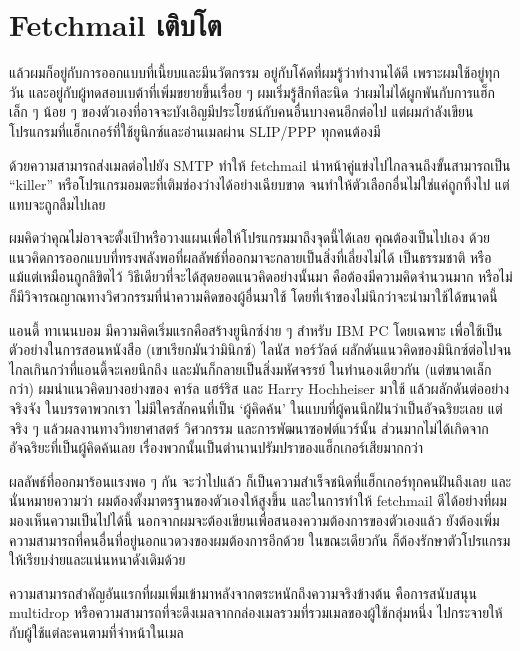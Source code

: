 \chapter{Fetchmail เติบโต}

แล้วผมก็อยู่กับการออกแบบที่เนี้ยบและมีนวัตกรรม
อยู่กับโค้ดที่ผมรู้ว่าทำงานได้ดี เพราะผมใช้อยู่ทุกวัน
และอยู่กับผู้ทดสอบเบต้าที่เพิ่มขยายขึ้นเรื่อย ๆ  ผมเริ่มรู้สึกทีละนิด
ว่าผมไม่ได้ผูกพันกับการแฮ็กเล็ก ๆ  น้อย ๆ
ของตัวเองที่อาจจะบังเอิญมีประโยชน์กับคนอื่นบางคนอีกต่อไป
แต่ผมกำลังเขียนโปรแกรมที่แฮ็กเกอร์ที่ใช้ยูนิกซ์และอ่านเมลผ่าน SLIP/PPP
ทุกคนต้องมี

ด้วยความสามารถส่งเมลต่อไปยัง SMTP ทำให้ fetchmail
นำหน้าคู่แข่งไปไกลจนถึงขั้นสามารถเป็น ``killer''
หรือโปรแกรมอมตะที่เติมช่องว่างได้อย่างเฉียบขาด
จนทำให้ตัวเลือกอื่นไม่ใช่แค่ถูกทิ้งไป แต่แทบจะถูกลืมไปเลย

ผมคิดว่าคุณไม่อาจจะตั้งเป้าหรือวางแผนเพื่อให้โปรแกรมมาถึงจุดนี้ได้เลย
คุณต้องเป็นไปเอง
ด้วยแนวคิดการออกแบบที่ทรงพลังพอที่ผลลัพธ์ที่ออกมาจะกลายเป็นสิ่งที่เลี่ยงไม่ได้
เป็นธรรมชาติ หรือแม้แต่เหมือนถูกลิขิตไว้
วิธีเดียวที่จะได้สุดยอดแนวคิดอย่างนั้นมา คือต้องมีความคิดจำนวนมาก
หรือไม่ก็มีวิจารณญาณทางวิศวกรรมที่นำความคิดของผู้อื่นมาใช้
โดยที่เจ้าของไม่นึกว่าจะนำมาใช้ได้ขนาดนี้

แอนดี้ ทาเนนบอม มีความคิดเริ่มแรกคือสร้างยูนิกซ์ง่าย ๆ  สำหรับ IBM PC
โดยเฉพาะ เพื่อใช้เป็นตัวอย่างในการสอนหนังสือ (เขาเรียกมันว่ามินิกซ์)
ไลนัส ทอร์วัลด์
ผลักดันแนวคิดของมินิกซ์ต่อไปจนไกลเกินกว่าที่แอนดี้จะเคยนึกถึง
และมันก็กลายเป็นสิ่งมหัศจรรย์ ในทำนองเดียวกัน (แต่ขนาดเล็กกว่า)
ผมนำแนวคิดบางอย่างของ คาร์ล แฮร์ริส และ Harry Hochheiser มาใช้
แล้วผลักดันต่ออย่างจริงจัง ในบรรดาพวกเรา ไม่มีใครสักคนที่เป็น
`ผู้คิดค้น' ในแบบที่ผู้คนนึกฝันว่าเป็นอัจฉริยะเลย แต่จริง ๆ
แล้วผลงานทางวิทยาศาสตร์ วิศวกรรม และการพัฒนาซอฟต์แวร์นั้น
ส่วนมากไม่ได้เกิดจากอัจฉริยะที่เป็นผู้คิดค้นเลย
เรื่องพวกนั้นเป็นตำนานปรัมปราของแฮ็กเกอร์เสียมากกว่า

ผลลัพธ์ที่ออกมาร้อนแรงพอ ๆ  กัน จะว่าไปแล้ว
ก็เป็นความสำเร็จชนิดที่แฮ็กเกอร์ทุกคนฝันถึงเลย และนั่นหมายความว่า
ผมต้องตั้งมาตรฐานของตัวเองให้สูงขึ้น และในการทำให้ fetchmail
ดีได้อย่างที่ผมมองเห็นความเป็นไปได้นี้
นอกจากผมจะต้องเขียนเพื่อสนองความต้องการของตัวเองแล้ว
ยังต้องเพิ่มความสามารถที่คนอื่นที่อยู่นอกแวดวงของผมต้องการอีกด้วย
ในขณะเดียวกัน ก็ต้องรักษาตัวโปรแกรมให้เรียบง่ายและแน่นหนาดังเดิมด้วย

ความสามารถสำคัญอันแรกที่ผมเพิ่มเข้ามาหลังจากตระหนักถึงความจริงข้างต้น
คือการสนับสนุน multidrop
หรือความสามารถที่จะดึงเมลจากกล่องเมลรวมที่รวมเมลของผู้ใช้กลุ่มหนึ่ง
ไปกระจายให้กับผู้ใช้แต่ละคนตามที่จ่าหน้าในเมล

